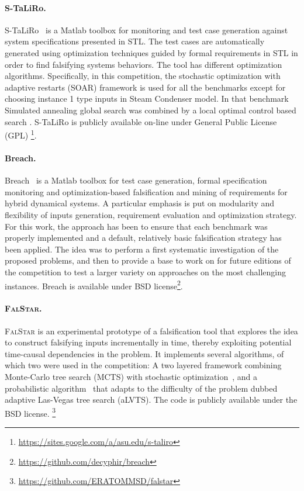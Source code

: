 \documentclass[a4paper]{easychair}
\newcommand{\STaLiRo}{S-TaLiRo\xspace}
\newcommand{\Breach}{Breach\xspace}
\newcommand{\FalStar}{\textsc{FalStar}\xspace}
\begin{document}
	\paragraph{\STaLiRo.} \STaLiRo~\cite{annpureddy2011s} is a Matlab
    toolbox for monitoring and test case generation against system
    specifications presented in STL. The test cases are automatically
    generated using optimization techniques guided by formal
    requirements in STL in order to find falsifying systems behaviors.
    The tool has different optimization algorithms. Specifically, in
    this competition, the stochastic optimization with adaptive
    restarts (SOAR) \cite{mathesen2019soar} framework is used for all
    the benchmarks except for choosing instance 1 type inputs in Steam
    Condenser model. In that benchmark Simulated annealing global
    search was combined by a local optimal control based search
    \cite{YaghoubiHSCC}.  \STaLiRo is publicly available on-line under
    General Public License (GPL) \footnote{\url{
        https://sites.google.com/a/asu.edu/s-taliro}}.

	\paragraph{\Breach.} \Breach~\cite{Donze2010} is a Matlab toolbox
    for test case generation, formal specification monitoring and
    optimization-based falsification and mining of requirements for
    hybrid dynamical systems. A particular emphasis is put on
    modularity and flexibility of inputs generation, requirement
    evaluation and optimization strategy. For this work, the approach
    has been to ensure that each benchmark was properly implemented
    and a default, relatively basic falsification strategy has been
    applied. The idea was to perform a first systematic investigation
    of the proposed problems, and then to provide a base to work on
    for future editions of the competition to test a larger variety on
    approaches on the most challenging instances.  Breach is available
    under BSD license\footnote{\url{https://github.com/decyphir/breach}}.

	\paragraph{\FalStar.}
	\FalStar is an experimental prototype of a falsification tool that
    explores the idea to construct falsifying inputs incrementally in
    time, thereby exploiting potential time-causal dependencies in the
    problem.  It implements several algorithms, of which two were used
    in the competition: A two layered framework combining Monte-Carlo
    tree search (MCTS) with stochastic
    optimization~\cite{ZhangESAH2018-MCTS}, and a probabilistic
    algorithm~\cite{ErnstSZH2018-FalStar} that adapts to the
    difficulty of the problem dubbed adaptive Las-Vegas tree search
    (aLVTS).  The code is publicly available under the BSD license.%
	\footnote{\url{https://github.com/ERATOMMSD/falstar}}
\end{document}
